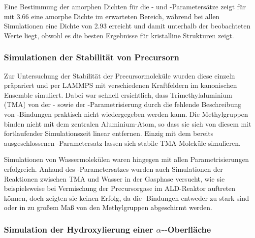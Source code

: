 Eine Bestimmung der amorphen Dichten für die - und -Parametersätze zeigt für  mit \SI{3.66}{\gpcc} eine amorphe Dichte im erwarteten Bereich, während  bei allen Simulationen eine Dichte von \SI{2.93}{\gpcc} erreicht und damit unterhalb der beobachteten Werte liegt, obwohl es die besten Ergebnisse für kristalline Strukturen zeigt.

\subsubsection{Simulationen der Stabilität von Precursorn}

Zur Untersuchung der Stabilität der Precursormoleküle wurden diese einzeln präpariert und per LAMMPS mit verschiedenen Kraftfeldern im kanonischen Ensemble simuliert.
Dabei war schnell ersichtlich, dass Trimethylaluminium (TMA) von der - sowie der -Para\-metr\-isierung durch die fehlende Beschreibung von -Bindungen praktisch nicht wiedergegeben werden kann.
Die Methylgruppen binden nicht mit dem zentralen Aluminium-Atom, so dass sie sich von diesem mit fortlaufender Simulationszeit linear entfernen.
Einzig mit dem bereits ausgeschlossenen -Parametersatz lassen sich stabile TMA-Moleküle simulieren.

Simulationen von Wassermolekülen waren hingegen mit allen Parametrisierungen erfolgreich.
Anhand des -Parametersatzes wurden auch Simulationen der Reaktionen zwischen TMA und Wasser in der Gasphase versucht, wie sie beispielsweise bei Vermischung der Precursorgase im ALD-Reaktor auftreten können, doch zeigten sie keinen Erfolg, da die -Bindungen entweder zu stark sind oder in zu großem Maß von den Methylgruppen abgeschirmt werden.

\subsubsection{Simulation der Hydroxylierung einer $\alpha$--Oberfläche}


